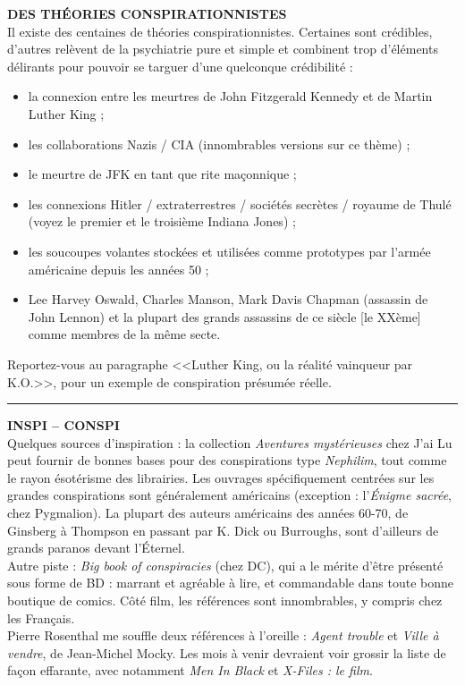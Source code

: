 \documentclass[11pt,twoside,a4paper]{article}
\begin{document}
\begin{multicols*}{2}
\textbf{\large DES TH{\'E}ORIES CONSPIRATIONNISTES}~\\
Il existe des centaines de th{\'e}ories conspirationnistes. Certaines sont cr{\'e}dibles, d'autres rel{\`e}vent de la psychiatrie pure et simple et combinent trop d'{\'e}l{\'e}ments d{\'e}lirants pour pouvoir se targuer d'une quelconque cr{\'e}dibilit{\'e} : 
\begin{itemize}
	\item la connexion entre les meurtres de John Fitzgerald Kennedy et de Martin Luther King ; 
	\item les collaborations Nazis / CIA (innombrables versions sur ce th{\`e}me) ; 
	\item le meurtre de JFK en tant que rite ma\c{c}onnique ; 
	\item les connexions Hitler / extraterrestres / soci{\'e}t{\'e}s secr{\`e}tes / royaume de Thul{\'e} (voyez le premier et le troisi{\`e}me Indiana Jones) ; 
	\item les soucoupes volantes stock{\'e}es et utilis{\'e}es comme prototypes par l'arm{\'e}e am{\'e}ricaine depuis les ann{\'e}es 50 ; 
	\item Lee Harvey Oswald, Charles Manson, Mark Davis Chapman (assassin de John Lennon) et la plupart des grands assassins de ce si{\`e}cle [le XX{\`e}me] comme membres de la m{\^e}me secte.
\end{itemize} 
Reportez-vous au paragraphe <<Luther King, ou la r{\'e}alit{\'e} vainqueur par K.O.>>, pour un exemple de conspiration pr{\'e}sum{\'e}e r{\'e}elle. 

\begin{center} \rule{0.45\textwidth}{0.01cm} \end{center}

\textbf{\large INSPI -- CONSPI}~\\
Quelques sources d'inspiration : la collection \emph{Aventures myst{\'e}rieuses} chez J'ai Lu peut fournir de bonnes bases pour des conspirations type \emph{Nephilim}, tout comme le rayon {\'e}sot{\'e}risme des librairies. Les ouvrages sp{\'e}cifiquement centr{\'e}es sur les grandes conspirations sont g{\'e}n{\'e}ralement am{\'e}ricains (exception : l'\emph{{\'E}nigme sacr{\'e}e}, chez Pygmalion). La plupart des auteurs am{\'e}ricains des ann{\'e}es 60-70, de Ginsberg {\`a} Thompson en passant par K. Dick ou Burroughs, sont d'ailleurs de grands paranos devant l'{\'E}ternel. ~\\
Autre piste : \emph{Big book of conspiracies} (chez DC), qui a le m{\'e}rite d'{\^e}tre pr{\'e}sent{\'e} sous forme de BD : marrant et agr{\'e}able {\`a} lire, et commandable dans toute bonne boutique de comics. C{\^o}t{\'e} film, les r{\'e}f{\'e}rences sont innombrables, y compris chez les Fran\c{c}ais. ~\\
Pierre Rosenthal me souffle deux r{\'e}f{\'e}rences {\`a} l'oreille : \emph{Agent trouble} et \emph{Ville {\`a} vendre}, de Jean-Michel Mocky. Les mois {\`a} venir devraient voir grossir la liste de fa\c{c}on effarante, avec notamment \emph{Men In Black} et \emph{X-Files : le film}. ~\\


\end{multicols*}
\end{document}
